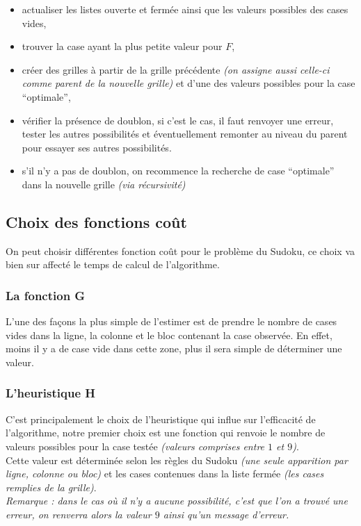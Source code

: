             \begin{itemize}
                \item actualiser les listes ouverte et fermée ainsi que les valeurs possibles des cases vides,
                \item trouver la case ayant la plus petite valeur pour $F$,
                \item créer des grilles à partir de la grille précédente \textit{(on assigne aussi celle-ci comme parent de la nouvelle grille)} et d'une des valeurs possibles pour la case ``optimale'',
                \item vérifier la présence de doublon, si c'est le cas, il faut renvoyer une erreur, tester les autres possibilités et éventuellement remonter au niveau du parent pour essayer ses autres possibilités.
                \item s'il n'y a pas de doublon, on recommence la recherche de case ``optimale'' dans la nouvelle grille \textit{(via récursivité)}
            \end{itemize}
        \subsection{Choix des fonctions coût}
            On peut choisir différentes fonction coût pour le problème du Sudoku, ce choix va bien sur affecté le temps de calcul de l'algorithme.
            \subsubsection*{La fonction G}
                L'une des façons la plus simple de l'estimer est de prendre le nombre de cases vides dans la ligne, la colonne et le bloc contenant la case observée. En effet, moins il y a de case vide dans cette zone, plus il sera simple de déterminer une valeur.
            \subsubsection*{L'heuristique H}
                C'est principalement le choix de l'heuristique qui influe sur l'efficacité de l'algorithme, notre premier choix est une fonction qui renvoie le nombre de valeurs possibles pour la case testée \textit{(valeurs comprises entre $1$ et $9$)}.\\
                Cette valeur est déterminée selon les règles du Sudoku \textit{(une seule apparition par ligne, colonne ou bloc)} et les cases contenues dans la liste fermée \textit{(les cases remplies de la grille)}.\\
                \textit{Remarque : dans le cas où il n'y a aucune possibilité, c'est que l'on a trouvé une erreur, on renverra alors la valeur $9$ ainsi qu'un message d'erreur.}
